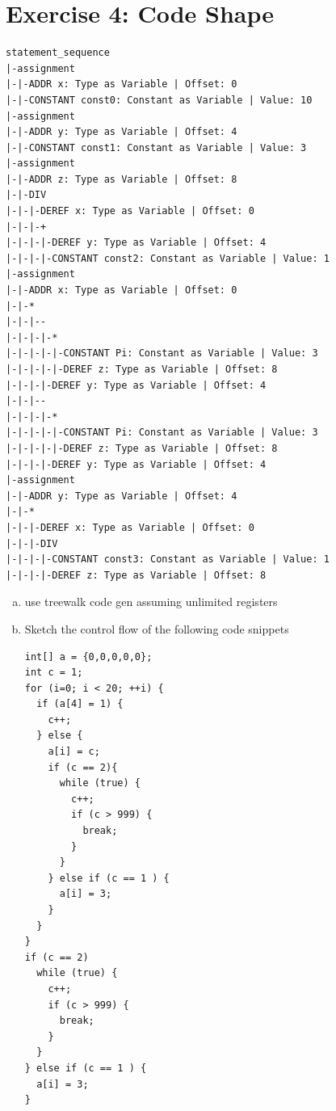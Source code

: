 \documentclass[a4paper]{article}
\begin{document}
	\section*{Exercise 4: Code Shape}\label{sec:exercise4}
	\begin{lstlisting}
statement_sequence
|-assignment
|-|-ADDR x: Type as Variable | Offset: 0
|-|-CONSTANT const0: Constant as Variable | Value: 10
|-assignment
|-|-ADDR y: Type as Variable | Offset: 4
|-|-CONSTANT const1: Constant as Variable | Value: 3
|-assignment
|-|-ADDR z: Type as Variable | Offset: 8
|-|-DIV
|-|-|-DEREF x: Type as Variable | Offset: 0
|-|-|-+
|-|-|-|-DEREF y: Type as Variable | Offset: 4
|-|-|-|-CONSTANT const2: Constant as Variable | Value: 1
|-assignment
|-|-ADDR x: Type as Variable | Offset: 0
|-|-*
|-|-|--
|-|-|-|-*
|-|-|-|-|-CONSTANT Pi: Constant as Variable | Value: 3
|-|-|-|-|-DEREF z: Type as Variable | Offset: 8
|-|-|-|-DEREF y: Type as Variable | Offset: 4
|-|-|--
|-|-|-|-*
|-|-|-|-|-CONSTANT Pi: Constant as Variable | Value: 3
|-|-|-|-|-DEREF z: Type as Variable | Offset: 8
|-|-|-|-DEREF y: Type as Variable | Offset: 4
|-assignment
|-|-ADDR y: Type as Variable | Offset: 4
|-|-*
|-|-|-DEREF x: Type as Variable | Offset: 0
|-|-|-DIV
|-|-|-|-CONSTANT const3: Constant as Variable | Value: 1
|-|-|-|-DEREF z: Type as Variable | Offset: 8

	\end{lstlisting}
\begin{enumerate}[a.]
	\item use treewalk code gen assuming unlimited registers
	\item Sketch the control flow of the following code snippets \\
	\newpage
		\begin{lstlisting}
int[] a = {0,0,0,0,0};
int c = 1;
for (i=0; i < 20; ++i) {
  if (a[4] = 1) {
    c++;
  } else {
    a[i] = c;
	if (c == 2){
	  while (true) {
	    c++;
		if (c > 999) {
		  break;
		}
	  }
	} else if (c == 1 ) {
	  a[i] = 3;
	}	
  }
}
if (c == 2)
  while (true) {
    c++;
	if (c > 999) {
	  break;
	}
  }
} else if (c == 1 ) {
  a[i] = 3;
}	
	\end{lstlisting}
\end{enumerate}
\end{document}
